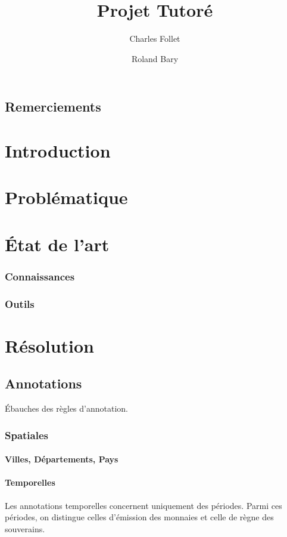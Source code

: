 \documentclass[a4paper, 11pt]{book}
\begin{document}
\title{Projet Tutoré}
\author{Charles Follet \and Roland Bary}
\maketitle
\section*{Remerciements}
\tableofcontents





\chapter{Introduction}
\chapter{Problématique}
\chapter{État de l'art}
\subsection{Connaissances}
\subsection{Outils}
\chapter{Résolution}
\section{Annotations}
Ébauches des règles d'annotation.
\subsection{Spatiales}
\subsubsection{Villes, Départements, Pays}

\newpage
\subsubsection{Temporelles}
Les annotations temporelles concernent uniquement des périodes. Parmi ces périodes, on distingue celles d'émission des monnaies et celle de règne des souverains.
\end{document}
